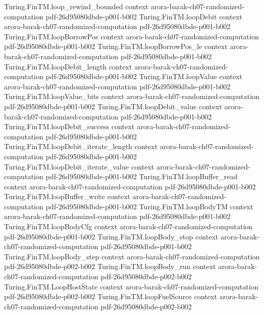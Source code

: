 \begin{theorem}
  {Turing.FinTM.loop_rewind_bounded}
  {context}
  {arora-barak-ch07-randomized-computation}
  {pdf-26d95080dbde-p001-b002}
\proofstep
  {Turing.FinTM.loopDebit}
  {context}
  {arora-barak-ch07-randomized-computation}
  {pdf-26d95080dbde-p001-b002}
\proofstep
  {Turing.FinTM.loopBorrowPos}
  {context}
  {arora-barak-ch07-randomized-computation}
  {pdf-26d95080dbde-p001-b002}
\proofstep
  {Turing.FinTM.loopBorrowPos_le}
  {context}
  {arora-barak-ch07-randomized-computation}
  {pdf-26d95080dbde-p001-b002}
\proofstep
  {Turing.FinTM.loopDebit_length}
  {context}
  {arora-barak-ch07-randomized-computation}
  {pdf-26d95080dbde-p001-b002}
\proofstep
  {Turing.FinTM.loopValue}
  {context}
  {arora-barak-ch07-randomized-computation}
  {pdf-26d95080dbde-p001-b002}
\proofstep
  {Turing.FinTM.loopValue_bits}
  {context}
  {arora-barak-ch07-randomized-computation}
  {pdf-26d95080dbde-p001-b002}
\proofstep
  {Turing.FinTM.loopDebit_value}
  {context}
  {arora-barak-ch07-randomized-computation}
  {pdf-26d95080dbde-p001-b002}
\proofstep
  {Turing.FinTM.loopDebit_success}
  {context}
  {arora-barak-ch07-randomized-computation}
  {pdf-26d95080dbde-p001-b002}
\proofstep
  {Turing.FinTM.loopDebit_iterate_length}
  {context}
  {arora-barak-ch07-randomized-computation}
  {pdf-26d95080dbde-p001-b002}
\proofstep
  {Turing.FinTM.loopDebit_iterate_value}
  {context}
  {arora-barak-ch07-randomized-computation}
  {pdf-26d95080dbde-p001-b002}
\proofstep
  {Turing.FinTM.loopBuffer_read}
  {context}
  {arora-barak-ch07-randomized-computation}
  {pdf-26d95080dbde-p001-b002}
\proofstep
  {Turing.FinTM.loopBuffer_write}
  {context}
  {arora-barak-ch07-randomized-computation}
  {pdf-26d95080dbde-p001-b002}
\proofstep
  {Turing.FinTM.loopBodyTM}
  {context}
  {arora-barak-ch07-randomized-computation}
  {pdf-26d95080dbde-p001-b002}
\proofstep
  {Turing.FinTM.loopBodyCfg}
  {context}
  {arora-barak-ch07-randomized-computation}
  {pdf-26d95080dbde-p001-b002}
\proofstep
  {Turing.FinTM.loopBody_stop}
  {context}
  {arora-barak-ch07-randomized-computation}
  {pdf-26d95080dbde-p001-b002}
\proofstep
  {Turing.FinTM.loopBody_step}
  {context}
  {arora-barak-ch07-randomized-computation}
  {pdf-26d95080dbde-p002-b002}
\proofstep
  {Turing.FinTM.loopBody_run}
  {context}
  {arora-barak-ch07-randomized-computation}
  {pdf-26d95080dbde-p002-b002}
\proofstep
  {Turing.FinTM.LoopHostState}
  {context}
  {arora-barak-ch07-randomized-computation}
  {pdf-26d95080dbde-p002-b002}
\proofstep
  {Turing.FinTM.loopFuelSource}
  {context}
  {arora-barak-ch07-randomized-computation}
  {pdf-26d95080dbde-p002-b002}

\end{theorem}
